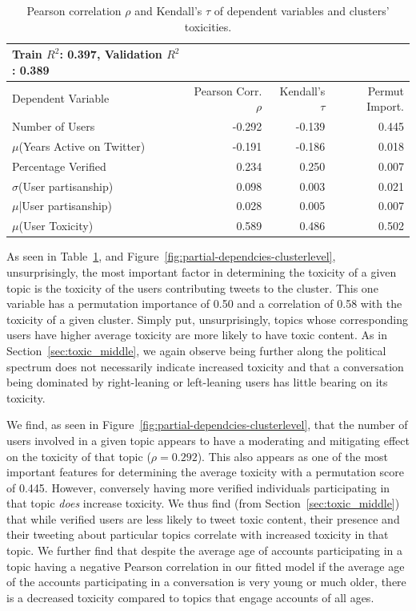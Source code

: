 \begin{table}
    \small
    \centering
    \begin{tabularx}{0.85\columnwidth}{l|rrr}
     Train $R^2$: 0.397, Validation $R^2$:  0.389  \\
    \toprule
      Dependent Variable  & Pearson Corr. $\rho$ & Kendall's $\tau$ & Permut Import. \\    \midrule
  Number of Users &-0.292 & -0.139  & 0.445  \\
 $\mu$(Years Active on Twitter) &-0.191 & -0.186 & 0.018\\
  Percentage Verified &0.234 & 0.250 & 0.007  \\
$\sigma$(User partisanship) & 0.098 & 0.003 & 0.021 \\
  $\mu$|User partisanship) & 0.028 &  0.005 & 0.007 \\
  $\mu$(User Toxicity) &  0.589 & 0.486 & 0.502 \\
    \bottomrule

    \end{tabularx}
  \caption{Pearson correlation $\rho$ and Kendall's $\tau$ of dependent variables and clusters' toxicities. } 
   \vspace{-15pt}
   \label{table:regression-clusterlevel}
\end{table}




As seen in Table~\ref{table:regression-clusterlevel}, and Figure~\ref{fig:partial-dependcies-clusterlevel}, unsurprisingly, the most important factor in determining the toxicity of a given topic is the toxicity of the users contributing tweets to the cluster. This one variable has a permutation importance of 0.50 and a correlation of 0.58 with the toxicity of a given cluster. Simply put, unsurprisingly, topics whose corresponding users have higher average toxicity are more likely to have toxic content. As in Section~\ref{sec:toxic_middle}, we again observe being further along the political spectrum does not necessarily indicate increased toxicity and that a conversation being dominated by right-leaning or left-leaning users has little bearing on its toxicity. 

We find, as seen in Figure~\ref{fig:partial-dependcies-clusterlevel}, that the number of users involved in a given topic appears to have a moderating and mitigating effect on the toxicity of that topic ($\rho=0.292$). This also appears as one of the most important features for determining the average toxicity with a permutation score of 0.445. However, conversely having more verified individuals participating in that topic \emph{does} increase toxicity. We thus find (from Section~\ref{sec:toxic_middle}) that while verified users are less likely to tweet toxic content, their presence and their tweeting about particular topics correlate with increased toxicity in that topic. We further find that despite the average age of accounts participating in a topic having a negative Pearson correlation in our fitted model if the average age of the accounts participating in a conversation is very young or much older, there is a decreased toxicity compared to topics that engage accounts of all ages.

